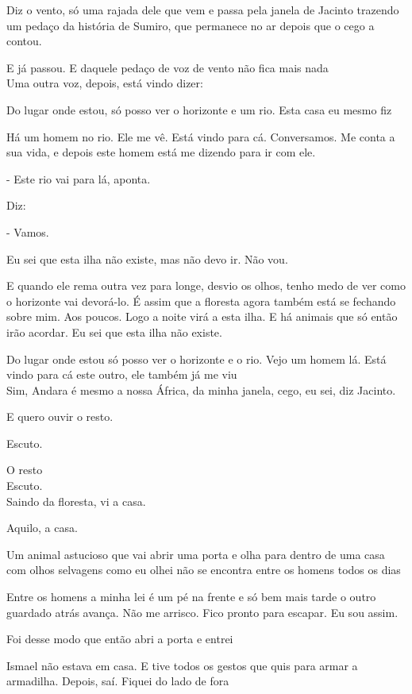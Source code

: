 Diz o vento, só uma rajada dele que vem e passa pela janela de Jacinto
trazendo um pedaço da história de Sumiro, que permanece no ar depois que
o cego a contou.

E já passou. E daquele pedaço de voz de vento não fica mais nada\\

Uma outra voz, depois, está vindo dizer:

Do lugar onde estou, só posso ver o horizonte e um rio. Esta casa eu
mesmo fiz

Há um homem no rio. Ele me vê. Está vindo para cá. Conversamos. Me conta
a sua vida, e depois este homem está me dizendo para ir com ele.

- Este rio vai para lá, aponta.

Diz:

- Vamos.

Eu sei que esta ilha não existe, mas não devo ir. Não vou.

E quando ele rema outra vez para longe, desvio os olhos, tenho medo de
ver como o horizonte vai devorá-lo. É assim que a floresta agora também
está se fechando sobre mim. Aos poucos. Logo a noite virá a esta ilha. E
há animais que só então irão acordar. Eu sei que esta ilha não existe.

Do lugar onde estou só posso ver o horizonte e o rio. Vejo um homem lá.
Está vindo para cá este outro, ele também já me viu\\

Sim, Andara é mesmo a nossa África, da minha janela, cego, eu sei, diz
Jacinto.

E quero ouvir o resto.

Escuto.

O resto\\

Escuto.\\

Saindo da floresta, vi a casa.

Aquilo, a casa.

Um animal astucioso que vai abrir uma porta e olha para dentro de uma
casa com olhos selvagens como eu olhei não se encontra entre os homens
todos os dias

Entre os homens a minha lei é um pé na frente e só bem mais tarde o
outro guardado atrás avança. Não me arrisco. Fico pronto para escapar.
Eu sou assim.

Foi desse modo que então abri a porta e entrei

Ismael não estava em casa. E tive todos os gestos que quis para armar a
armadilha. Depois, saí. Fiquei do lado de fora

